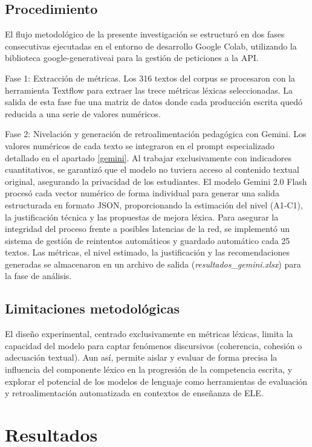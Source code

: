 \documentclass[spanish]{textolivre}
\begin{document}
\subsection{Procedimiento}

El flujo metodológico de la presente investigación se estructuró en dos fases consecutivas ejecutadas en el entorno de desarrollo Google Colab, utilizando la biblioteca google-generativeai para la gestión de peticiones a la API.

Fase 1: Extracción de métricas. Los 316 textos del corpus se procesaron con la herramienta Textflow para extraer las trece métricas léxicas seleccionadas. La salida de esta fase fue una matriz de datos donde cada producción escrita quedó reducida a una serie de valores numéricos.

Fase 2: Nivelación y generación de retroalimentación pedagógica con Gemini. Los valores numéricos de cada texto se integraron en el prompt especializado detallado en el apartado \ref{gemini}. Al trabajar exclusivamente con indicadores cuantitativos, se garantizó que el modelo no tuviera acceso al contenido textual original, asegurando la privacidad de los estudiantes. El modelo Gemini 2.0 Flash procesó cada vector numérico de forma individual para generar una salida estructurada en formato JSON, proporcionando la estimación del nivel (A1-C1), la justificación técnica y las propuestas de mejora léxica. Para asegurar la integridad del proceso frente a posibles latencias de la red, se implementó un sistema de gestión de reintentos automáticos y guardado automático cada 25 textos. Las métricas, el nivel estimado, la justificación y las recomendaciones generadas se almacenaron en un archivo de salida (\textit{resultados\_gemini.xlsx}) para la fase de análisis.

\subsection{Limitaciones metodológicas}

El diseño experimental, centrado exclusivamente en métricas léxicas, limita la capacidad del modelo para captar fenómenos discursivos (coherencia, cohesión o adecuación textual). Aun así, permite aislar y evaluar de forma precisa la influencia del componente léxico en la progresión de la competencia escrita, y explorar el potencial de los modelos de lenguaje como herramientas de evaluación y retroalimentación automatizada en contextos de enseñanza de ELE.

\section{Resultados}
\end{document}
